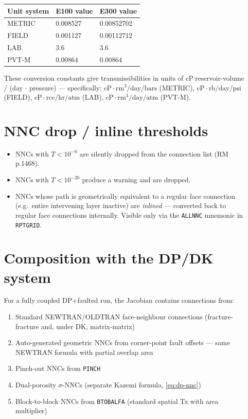 \documentclass[11pt,a4paper]{article}
\newcommand{\kw}[1]{\texttt{#1}}
\begin{document}
\begin{center}\small
\begin{tabular}{lll}
\toprule
Unit system & E100 value & E300 value \\
\midrule
METRIC  & 0.008527 & 0.00852702 \\
FIELD   & 0.001127 & 0.00112712 \\
LAB     & 3.6      & 3.6        \\
PVT-M   & 0.00864  & 0.00864    \\
\bottomrule
\end{tabular}
\end{center}

These conversion constants give transmissibilities in units of cP$\cdot$reservoir-volume / (day $\cdot$ pressure) — specifically:
$\text{cP}\cdot\text{rm}^{3}/\text{day}/\text{bars}$ (METRIC),
$\text{cP}\cdot\text{rb}/\text{day}/\text{psi}$ (FIELD),
$\text{cP}\cdot\text{rcc}/\text{hr}/\text{atm}$ (LAB),
$\text{cP}\cdot\text{rm}^{3}/\text{day}/\text{atm}$ (PVT-M).

\section{NNC drop / inline thresholds}
\begin{itemize}
  \item NNCs with $T < 10^{-6}$ are silently dropped from the connection list (RM p.1468).
  \item NNCs with $T < 10^{-20}$ produce a warning and are dropped.
  \item NNCs whose path is geometrically equivalent to a regular face connection (e.g.\ entire intervening layer inactive) are \emph{inlined} — converted back to regular face connections internally. Visible only via the \kw{ALLNNC} mnemonic in \kw{RPTGRID}.
\end{itemize}

\section{Composition with the DP/DK system}

For a fully coupled DP+faulted run, the Jacobian contains connections from:
\begin{enumerate}
  \item Standard NEWTRAN/OLDTRAN face-neighbour connections (fracture-fracture and, under DK, matrix-matrix)
  \item Auto-generated geometric NNCs from corner-point fault offsets — same NEWTRAN formula with partial overlap area
  \item Pinch-out NNCs from \kw{PINCH}
  \item Dual-porosity $\sigma$-NNCs (separate Kazemi formula, \eqref{eq:dp-nnc})
  \item Block-to-block NNCs from \kw{BTOBALFA} (standard spatial Tx with area multiplier)
\end{enumerate}
\end{document}
